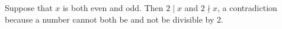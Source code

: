 Suppose that $x$ is both even and odd.
Then $2 \mid x$ and $2 \nmid x$, a contradiction because a number cannot both be and not be divisible by $2$.